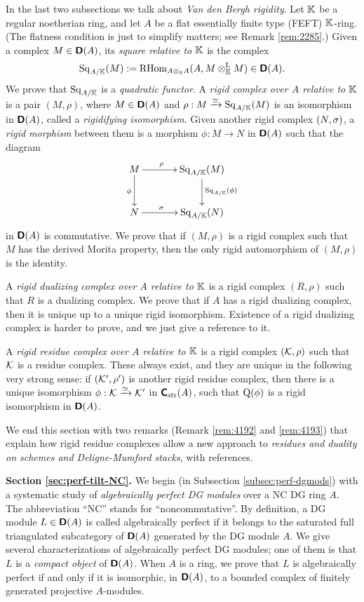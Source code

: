 In the last two subsections we talk about {\em Van den Bergh rigidity}.
Let $\mathbb{K}$ be a regular noetherian ring, and let $A$ be a flat essentially finite 
type (FEFT) $\mathbb{K}$-ring. (The flatness condition is just to simplify matters; see 
Remark  \ref{rem:2285}.)  Given a complex $M \in \boldsymbol{\mathsf{D}}(A)$, its {\em square 
relative to $\mathbb{K}$} is the complex
\[ \operatorname{Sq}_{A / \mathbb{K}}(M) := 
\operatorname{RHom}_{A \otimes_{\mathbb{K}} A}(A, M \otimes^{\mathrm{L}}_{\mathbb{K}} M) \in \boldsymbol{\mathsf{D}}(A) . \]
We prove that $\operatorname{Sq}_{A / \mathbb{K}}$ is a {\em quadratic functor}. 
A {\em rigid complex over $A$ relative to $\mathbb{K}$} is a pair 
$(M, \rho)$, where $M \in \boldsymbol{\mathsf{D}}(A)$ and 
$\rho : M \xrightarrow{\simeq} \operatorname{Sq}_{A / \mathbb{K}}(M)$
is an isomorphism in $\boldsymbol{\mathsf{D}}(A)$, called a {\em rigidifying isomorphism}.
Given another rigid complex $(N, \sigma)$, a {\em rigid morphism} between 
them is a morphism $\phi : M \to N$ in $\boldsymbol{\mathsf{D}}(A)$ such that 
the diagram 
\begin{equation} \label{eqn:5015}
\UseTips \xymatrix @C=8ex @R=6ex {
M
\ar[d]_{\phi}
\ar[r]^(0.4){\rho}
&
\opn{Sq}_{A / \K}(M)
\ar[d]^{\opn{Sq}_{A / \K}(\phi)}
\\
N
\ar[r]^(0.4){\si}
&
\opn{Sq}_{A / \K}(N)
}
\end{equation}
in $\boldsymbol{\mathsf{D}}(A)$ is commutative. 
We prove that if $(M, \rho)$ is a rigid complex such that $M$ has the derived 
Morita property, then the only rigid automorphism of $(M, \rho)$ is the 
identity. 

A {\em rigid dualizing complex over $A$ relative to $\mathbb{K}$} is a rigid complex 
$(R, \rho)$ such that $R$ is a dualizing complex. We prove that if $A$ has a 
rigid dualizing complex, then it is unique up to a unique rigid isomorphism.
Existence of a rigid dualizing complex is harder to prove, and we just give a 
reference to it. 

A {\em rigid residue complex over $A$ relative to $\mathbb{K}$} is a rigid complex 
$(\mathcal{K}, \rho)$ such that $\mathcal{K}$ is a residue complex. These always exist, 
and they are unique in the following very strong sense: if $(\mathcal{K}', \rho')$ 
is another rigid residue complex, then there is a 
unique isomorphism $\phi : \mathcal{K} \xrightarrow{\simeq} \mathcal{K}'$ in $\boldsymbol{\mathsf{C}}_{\mathrm{str}}(A)$, such 
that $\operatorname{Q}(\phi)$ is a rigid isomorphism in $\boldsymbol{\mathsf{D}}(A)$.

We end this section 
with two remarks (Remark \ref{rem:4192} and \ref{rem:4193}) 
that explain how rigid residue complexes allow a new approach to {\em residues 
and duality on schemes and Deligne-Mumford stacks}, with references. 


\medskip \noindent 
{\bf Section \ref{sec:perf-tilt-NC}.}
We begin (in Subsection \ref{subsec:perf-dgmods}) with a systematic 
study of {\em algebraically perfect DG modules} over a NC DG ring $A$. 
The abbreviation ``NC'' stands for ``noncommutative''. By 
definition, a DG module $L \in \boldsymbol{\mathsf{D}}(A)$ is called algebraically perfect if 
it belongs to the saturated full triangulated subcategory of $\boldsymbol{\mathsf{D}}(A)$ 
generated by the DG module $A$. We give several characterizations of 
algebraically perfect DG modules; one of them is that $L$ is a {\em compact 
object} of $\boldsymbol{\mathsf{D}}(A)$. When $A$ is a ring, we prove that $L$ is  
algebraically perfect if and only if it is isomorphic, in $\boldsymbol{\mathsf{D}}(A)$, to a 
bounded complex of finitely generated projective $A$-modules. 

